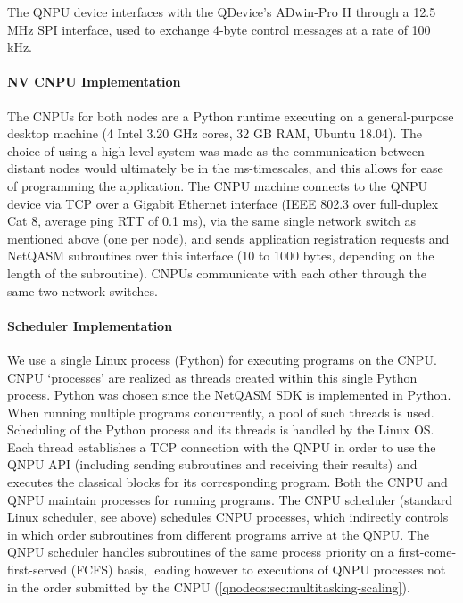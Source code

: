 The QNPU device interfaces with the QDevice's ADwin-Pro II through a 12.5 MHz SPI interface, used to exchange 4-byte control messages at a rate of 100 kHz.  

\paragraph{NV CNPU Implementation}

The CNPUs for both nodes are a Python runtime executing on a general-purpose desktop machine (4 Intel 3.20 GHz cores, 32 GB RAM, Ubuntu 18.04).
The choice of using a high-level system was made as the communication between distant nodes would ultimately be in the ms-timescales, and this allows for ease of programming the application.
The CNPU machine connects to the QNPU device via TCP over a Gigabit Ethernet interface (IEEE 802.3 over full-duplex Cat 8, average ping RTT of 0.1 ms), via the same single network switch as mentioned above (one per node), and sends application registration requests and NetQASM subroutines over this interface (10 to 1000 bytes, depending on the length of the subroutine).
CNPUs communicate with each other through the same two network switches.

\paragraph{Scheduler Implementation}

We use a single Linux process (Python) for executing programs on the CNPU.
CNPU `processes' are realized as threads created within this single Python process.
Python was chosen since the NetQASM SDK is implemented in Python.
When running multiple programs concurrently, a pool of such threads is used.
Scheduling of the Python process and its threads is handled by the Linux OS.
Each thread establishes a TCP connection with the QNPU in order to use the QNPU API (including sending subroutines and receiving their results) and executes the classical blocks for its corresponding program. 
Both the CNPU and QNPU maintain processes for running programs.
The CNPU scheduler (standard Linux scheduler, see above) schedules CNPU processes, which indirectly controls in which order subroutines from different programs arrive at the QNPU.
The QNPU scheduler handles subroutines of the same process priority on a first-come-first-served (FCFS) basis, leading however to executions of QNPU processes not in the order submitted by the CNPU (\cref{qnodeos:sec:multitasking-scaling}).

